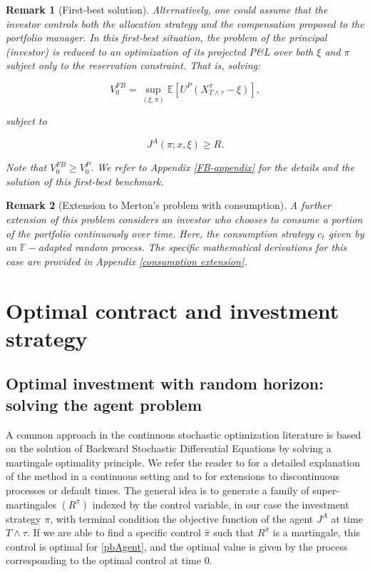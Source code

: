 \documentclass[11pt,a4paper]{article}
\theoremstyle{thmstyleone}%
\theoremstyle{thmstyletwo}%
\newtheorem{remark}{Remark}%
\theoremstyle{thmstylethree}%
\begin{document}
\begin{remark}[First-best solution]

Alternatively, one could assume that the investor controls both the allocation strategy and the compensation proposed to the portfolio manager. In this \textit{first-best} situation, the problem of the principal (investor) is reduced to an optimization of its projected P\&L over both $\xi$ and $\pi$ subject only to the reservation constraint. That is, solving:

\begin{equation*}
    V^{FB}_0 = \sup_{(\xi,\pi)} \mathbb{E} \left[ U^P(X^\pi_{T\wedge \tau} - \xi) \right],
\end{equation*}

subject to 

\begin{equation*}
    J^A(\pi; x, \xi) \geq R.
\end{equation*}

Note that $V^{FB}_0 \geq V^P_0$. We refer to Appendix \ref{FB-appendix} for the details and the solution of this first-best benchmark.
\end{remark}


\begin{remark}[Extension to Merton's problem with consumption]
A further extension of this problem considers an investor who chooses to consume a portion of the portfolio continuously over time. Here, the consumption strategy $c_t$ given by an $\mathbb F-$adapted random process. The specific mathematical derivations for this case are provided in Appendix \ref{consumption extension}.
\end{remark}

\section{Optimal contract and investment strategy}\label{chap3}


\subsection{Optimal investment with random horizon: solving the agent problem}
A common approach in the continuous stochastic optimization literature is based on the solution of Backward Stochastic Differential Equations by solving a martingale optimality principle. We refer the reader to \cite{hu2005utility} for a detailed explanation of the method in a continuous setting and to \cite{morlais2009utility,kharroubi2013mean,jeanblanc2015utility} for extensions to discontinuous processes or default times. The general idea is to generate a family of super-martingales $(R^\pi)$ indexed by the control variable, in our case the investment strategy $\pi$, with terminal condition the objective function of the agent $J^A$ at time $T\wedge \tau$. If we are able to find a specific control $\hat\pi$ such that $R^{\hat\pi}$ is a martingale, this control is optimal for \eqref{pbAgent}, and the optimal value is given by the process corresponding to the optimal control at time $0$. 
\end{document}
